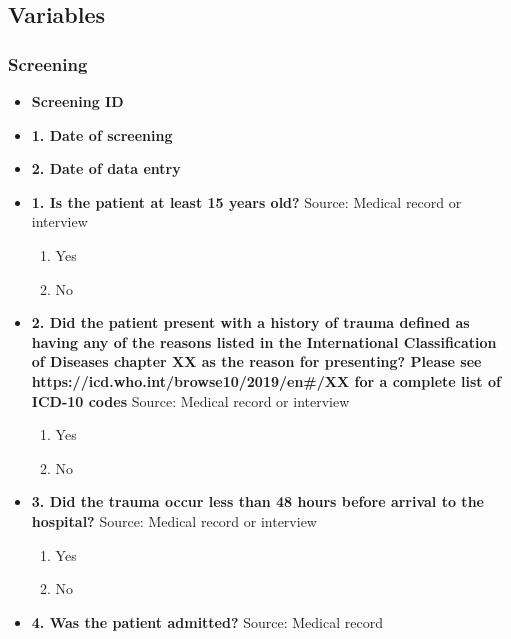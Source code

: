 \documentclass[
]{scrartcl}
\providecommand{\tightlist}{%
  \setlength{\itemsep}{0pt}\setlength{\parskip}{0pt}}\usepackage{longtable,booktabs,array}
\begin{document}
\hypertarget{sec-variables}{%
\subsection{Variables}\label{sec-variables}}

\hypertarget{screening-3}{%
\subsubsection{Screening}\label{screening-3}}

\begin{itemize}
\item
  \textbf{Screening ID}
\item
  \textbf{1. Date of screening}
\item
  \textbf{2. Date of data entry}
\item
  \textbf{1. Is the patient at least 15 years old?} Source: Medical
  record or interview

  \begin{enumerate}
  \def\labelenumi{\arabic{enumi}.}
  \tightlist
  \item
    Yes
  \item
    No
  \end{enumerate}
\item
  \textbf{2. Did the patient present with a history of trauma defined as
  having any of the reasons listed in the International Classification
  of Diseases chapter XX as the reason for presenting? Please see
  https://icd.who.int/browse10/2019/en\#/XX for a complete list of
  ICD-10 codes} Source: Medical record or interview

  \begin{enumerate}
  \def\labelenumi{\arabic{enumi}.}
  \tightlist
  \item
    Yes
  \item
    No
  \end{enumerate}
\item
  \textbf{3. Did the trauma occur less than 48 hours before arrival to
  the hospital?} Source: Medical record or interview

  \begin{enumerate}
  \def\labelenumi{\arabic{enumi}.}
  \tightlist
  \item
    Yes
  \item
    No
  \end{enumerate}
\item
  \textbf{4. Was the patient admitted?} Source: Medical record


\end{itemize}
\end{document}
